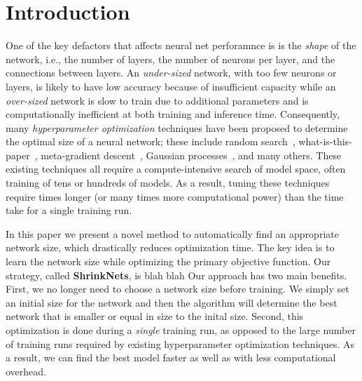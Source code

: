 
\section{Introduction}

One of the key defactors that affects neural net perforamnce is  is the {\it shape} of the network, 
i.e., the number of layers, the number of neurons per layer, and the connections between
layers.
An {\it under-sized} network, with too few neurons or layers,
 is likely to have low accuracy because of insufficient 
capacity while an {\it over-sized} network is slow to train due to additional 
parameters and is computationally inefficient at both training and inference time.
Consequently, many {\it hyperparameter optimization} techniques have been proposed to determine the optimal size of
a neural network; these include random search~\cite{paper-on-random-is-good-enough}, 
what-is-this-paper~\cite{Bengio2012a}, 
meta-gradient descent~\cite{Pedregosa2016},
Gaussian processes~\cite{Bergstra2011a}, and many others.
These existing techniques all require a compute-intensive search of 
model space,  often training of tens or hundreds of models.
As a result, tuning these techniques require times 
longer (or many times more computational power) 
than the time take for a single training run.

In this paper we present a novel method to automatically find an appropriate
network size, which drastically reduces optimization time. 
The key idea is to learn the network size while optimizing the primary objective function.
Our strategy, called \textbf{ShrinkNets}, is blah blah 
Our approach has two main benefits. 
First, we no longer need to choose a network size before training.
We simply set an initial size for the network and then the algorithm will
determine the best network that is smaller or equal in size to the inital size.
Second, this optimization is done during a {\it single} training run, as opposed to the large number of training runs
required by existing hyperparameter optimization 
techniques.  As a result, we can find the best model 
faster as well as with less computational overhead.

